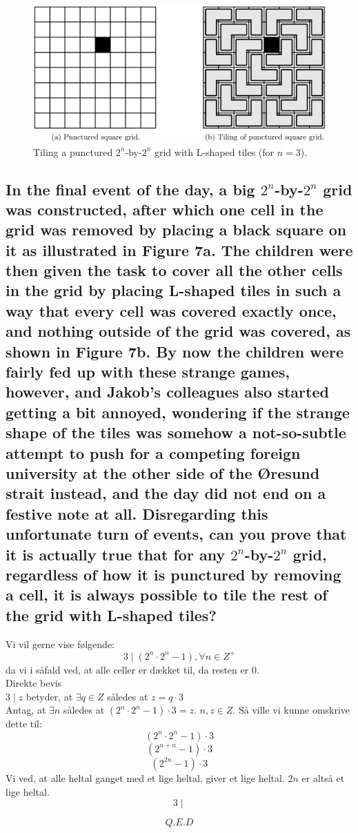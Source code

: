 \documentclass[a4paper,12pt]{article}
\begin{document}
\begin{figure}[H]
    \centering
    \includegraphics[width=1\textwidth]{figur.png}
    \caption{Tiling a punctured $2^n$-by-$2^n$ grid with L-shaped tiles (for $n = 3$).}
\end{figure}

\subsection[]{In the final event of the day, a big $2^n$-by-$2^n$ grid was constructed, after which one cell in the grid was removed by placing a black square on it as illustrated in Figure 7a. The children were then given the task to cover all the other cells in the grid by placing L-shaped tiles in such a way that every cell was covered exactly once, and nothing outside of the grid was covered, as shown in Figure 7b. By now the children were fairly fed up with these strange games, however, and Jakob’s colleagues also started getting a bit annoyed, wondering if the strange shape of the tiles was somehow a not-so-subtle attempt to push for a competing foreign university at the other side of the Øresund strait instead, and the day did not end on a festive note at all. Disregarding this unfortunate turn of events, can you prove that it is actually true that for any $2^n$-by-$2^n$ grid, regardless of how it is punctured by removing a cell, it is always possible to tile the rest of the grid with L-shaped tiles?}

Vi vil gerne vise følgende:
\[3 \mid (2^n \cdot 2^n - 1), \forall n\in Z^+\]
da vi i såfald ved, at alle celler er dækket til, da resten er 0.\\
Direkte bevis\\
$3 \mid z$ betyder, at $\exists q \in Z$ således at $z = q \cdot 3$\\
Antag, at $\exists n$ således at $(2^n \cdot 2^n - 1) \cdot 3 = z.$ $n,z \in Z$. Så ville vi kunne omskrive dette til:
\[(2^n \cdot 2^n - 1) \cdot 3\]
\[(2^{n+n} - 1) \cdot 3\]
\[(2^{2n} - 1) \cdot 3\]
Vi ved, at alle heltal ganget med et lige heltal, giver et lige heltal. $2n$ er altså et lige heltal.
\[3 \mid \]

\[Q.E.D\]
\end{document}
